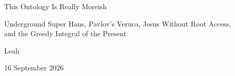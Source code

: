 \documentclass[10pt,letterpaper]{article}
\begin{document}
\pagestyle{plain}

\vspace*{-0.32in}
\begin{center}
{\LARGE This Ontology Is Really Moreish\par}
\vspace{0.35em}
{\large Underground Super Hans, Pavlov's Veruca, Jesus Without Root Access,\\
and the Greedy Integral of the Present\par}

\vspace{0.45in}
{\normalsize Leah\par}
\vspace{0.18em}
{\normalsize 16 September 2026\par}
\end{center}

\vspace{0.08in}
\end{document}
